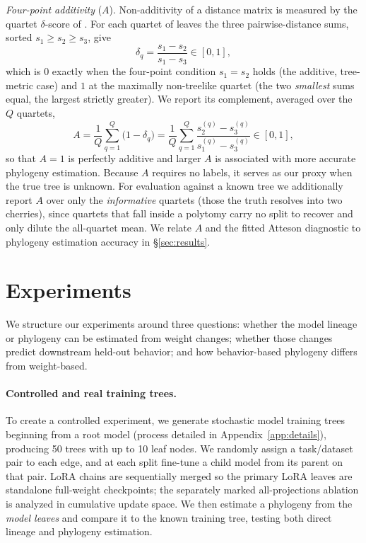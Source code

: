 \documentclass{article}
\theoremstyle{definition}
\theoremstyle{plain}
\begin{document}
\textit{Four-point additivity} ($A$). Non-additivity of a distance matrix is measured by the quartet
$\delta$-score of \citet{holland2002delta}. For each quartet of leaves the three pairwise-distance sums,
sorted $s_1\ge s_2\ge s_3$, give
\[
  \delta_q=\frac{s_1-s_2}{s_1-s_3}\in[0,1] ,
\]
which is $0$ exactly when the four-point condition $s_1=s_2$ holds \citep{sempleSteel2003phylogenetics}
(the additive, tree-metric case) and $1$ at the maximally non-treelike quartet (the two \emph{smallest}
sums equal, the largest strictly greater). We report its complement, averaged over the $Q$ quartets,
\[
  A=\frac{1}{Q}\sum_{q=1}^{Q}\bigl(1-\delta_q\bigr)
   =\frac{1}{Q}\sum_{q=1}^{Q}\frac{s_2^{(q)}-s_3^{(q)}}{s_1^{(q)}-s_3^{(q)}}\in[0,1] ,
\]
so that $A=1$ is perfectly additive and larger $A$ is associated with more accurate phylogeny estimation. Because $A$ requires no labels,
it serves as our proxy when the true tree is unknown. For evaluation against a known tree we
additionally report $A$ over only the \emph{informative} quartets (those the truth resolves into two
cherries), since quartets that fall inside a polytomy carry no split to recover and only dilute the
all-quartet mean. We relate $A$ and the fitted Atteson diagnostic to phylogeny estimation accuracy in \S\ref{sec:results}.


\section{Experiments}
\label{sec:experiments}
We structure our experiments around three questions: whether the model lineage or phylogeny can be
estimated from weight changes; whether those changes predict downstream held-out behavior; and
how behavior-based phylogeny differs from weight-based.

\paragraph{Controlled and real training trees.}
\label{sec:exp:trees}

To create a controlled experiment, we generate stochastic model training trees beginning from a root model (process detailed in Appendix~\ref{app:details}), producing 50 trees with up to 10 leaf nodes. We randomly assign a task/dataset pair to each edge, and at each split fine-tune a child model from its parent on that pair. LoRA chains are sequentially merged so the primary LoRA leaves are standalone full-weight checkpoints; the separately marked all-projections ablation is analyzed in cumulative update space. We then estimate a phylogeny from the \textit{model leaves} and compare it to the known training tree, testing both direct lineage and phylogeny estimation.
\end{document}

